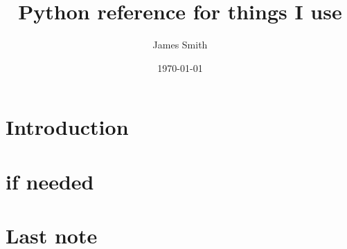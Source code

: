 \documentclass{book}
\begin{document}
\frontmatter

\title{Python reference for things I use}
\author{James Smith}
\date{\today}
\maketitle

\tableofcontents

\chapter{Introduction}

\mainmatter%




\appendix
\chapter{if needed}

\backmatter%
\chapter{Last note}
\end{document}

